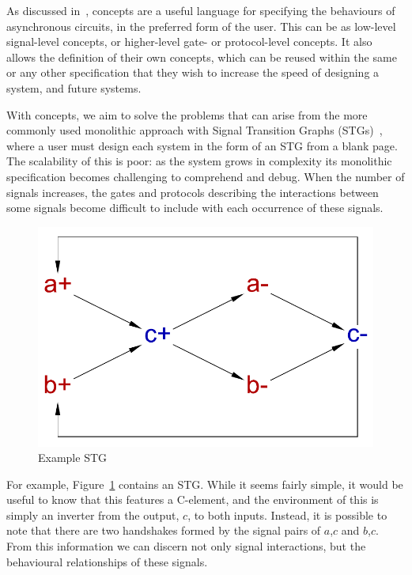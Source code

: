 \documentclass[british,conference,compsoc]{IEEEtran}
\begin{document}
As discussed in~\cite{2015_Beaumont_MEMOCODE}, concepts are a useful language 
for specifying the behaviours of asynchronous circuits, in the preferred form 
of the user. This can be as low-level signal-level concepts, or higher-level 
gate- or protocol-level concepts. It also allows the definition of their own 
concepts, which can be reused within the same or any other specification that 
they wish to increase the speed of designing a system, and future systems. 

With concepts, we aim to solve the problems that can arise from the more 
commonly used monolithic approach with Signal Transition Graphs (STGs)~\cite{Chu_1987_phd}\cite{Rosenblum_1985_tpn},
where a user must design each system in the 
form of an STG from a blank page. The scalability of this is poor: as the 
system grows in complexity its monolithic specification becomes challenging to 
comprehend and debug. When the number of signals increases, the gates and 
protocols describing the interactions between some signals become difficult to
include with each occurrence of these signals. 

\begin{figure}[h]
\vspace{-3mm}
\begin{centering}
\includegraphics[scale=0.3]{Images/cElement-stg.pdf}
\par\end{centering}
\protect\caption{\label{fig:cElement-stg} Example STG}
\vspace{-6mm}
\end{figure}

For example, Figure~\ref{fig:cElement-stg} contains an STG. 
While it seems fairly simple, it would be useful to know that this features a C-element,
and the environment of this is simply an inverter from the output, $c$, to both inputs.
Instead, it is possible to note that there are two handshakes formed by the signal pairs of $a$,$c$ and $b$,$c$. 
From this information we can discern not only signal interactions, but the behavioural
relationships of these signals. 
\end{document}
